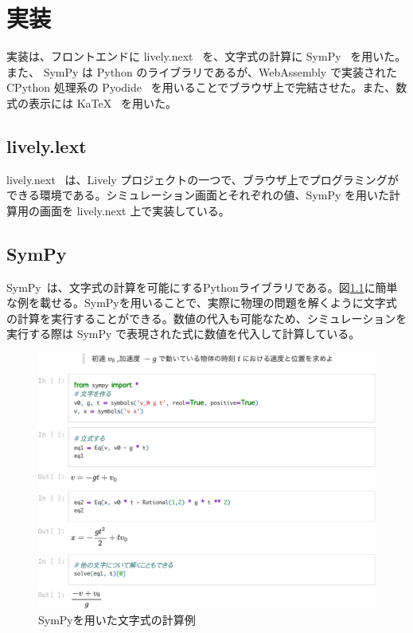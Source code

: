\chapter{実装} \label{implementation}

実装は、フロントエンドに lively.next~\cite{lively.next} を、文字式の計算に SymPy~\cite{SymPy} を用いた。また、 SymPy は Python のライブラリであるが、WebAssembly で実装された CPython 処理系の Pyodide~\cite{Pyodide} を用いることでブラウザ上で完結させた。また、数式の表示には KaTeX~\cite{KaTeX} を用いた。

\section{lively.lext}
lively.next~\cite{lively.next} は、Lively プロジェクト\cite{lively}の一つで、ブラウザ上でプログラミングができる環境である。シミュレーション画面とそれぞれの値、SymPy を用いた計算用の画面を lively.next 上で実装している。

\section{SymPy}
SymPy~\cite{SymPy}は、文字式の計算を可能にするPythonライブラリである。図\ref{SymPy_example}に簡単な例を載せる。SymPyを用いることで、実際に物理の問題を解くように文字式の計算を実行することができる。数値の代入も可能なため、シミュレーションを実行する際は SymPy で表現された式に数値を代入して計算している。

\clearpage
{}
\begin{figure}
\includegraphics[page=1, scale=.9]{work/SymPy_example-crop.pdf}
\caption{SymPyを用いた文字式の計算例} \label{SymPy_example}
\end{figure}
\restoregeometry
\clearpage

